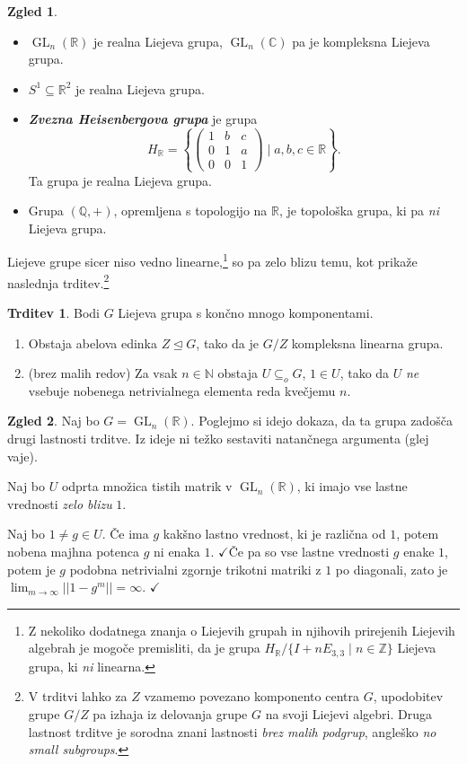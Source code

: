 \documentclass[11pt]{book}
\def\NN{\mathbb{N}}
\def\ZZ{\mathbb{Z}}
\def\QQ{\mathbb{Q}}
\def\RR{\mathbb{R}}
\def\CC{\mathbb{C}}
\DeclareMathOperator\GL{GL}
\def\definicija{\color{rdeca}\bf\em}
\def\vprasanje{\color{oranzna}}
\def\literatura{\color{modra}}
\def\vaje{{\literatura (glej vaje)}}
\def\kljuka{$\checkmark$}
\theoremstyle{definition}
\theoremstyle{zgled}
\newtheorem*{zgled}{Zgled}
\theoremstyle{odprtproblem}
\theoremstyle{domacanaloga}
\theoremstyle{izrek}
\newtheorem*{trditev}{Trditev}
\begin{document}
\begin{zgled}
\begin{itemize}
    \item $\GL_n(\RR)$ je realna Liejeva grupa, $\GL_n(\CC)$ pa je kompleksna Liejeva grupa.
    \item $S^1 \subseteq \RR^2$ je realna Liejeva grupa.
    \item {\definicija Zvezna Heisenbergova grupa} je grupa
    \[
    H_{\RR} = \left\{ \begin{pmatrix} 1 & b & c \\ 0 & 1 & a \\ 0 & 0 & 1 \end{pmatrix} \mid a,b,c \in \RR \right\}.
    \]
    Ta grupa je realna Liejeva grupa.
    \item Grupa $(\QQ, +)$, opremljena s topologijo na $\RR$, je topološka grupa, ki pa {\em ni} Liejeva grupa.
\end{itemize}
\end{zgled}

Liejeve grupe sicer niso vedno linearne,\footnote{Z nekoliko dodatnega znanja o Liejevih grupah in njihovih prirejenih Liejevih algebrah je mogoče premisliti, da je grupa $H_\RR / \{ I + n E_{3,3} \mid n \in \ZZ \}$ Liejeva grupa, ki {\em ni} linearna.} so pa zelo blizu temu, kot prikaže naslednja trditev.\footnote{V trditvi lahko za $Z$ vzamemo povezano komponento centra $G$, upodobitev grupe $G/Z$ pa izhaja iz delovanja grupe $G$ na svoji Liejevi algebri. Druga lastnost trditve je sorodna znani lastnosti {\em brez malih podgrup}, angleško {\em no small subgroups}.}

\begin{trditev}
Bodi $G$ Liejeva grupa s končno mnogo komponentami.
\vspace{-0.5\baselineskip}
\begin{enumerate}[noitemsep]
    \item Obstaja abelova edinka $Z \unlhd G$, tako da je $G/Z$ kompleksna linearna grupa.
    \item {\vprasanje (brez malih redov)} Za vsak $n \in \NN$ obstaja $U \subseteq_o G$, $1 \in U$, tako da $U$ {\em ne} vsebuje nobenega netrivialnega elementa reda kvečjemu $n$. \vspace{-\baselineskip}
\end{enumerate}
\end{trditev}

\begin{zgled}
Naj bo $G = \GL_n(\RR)$. Poglejmo si idejo dokaza, da ta grupa zadošča drugi lastnosti trditve. Iz ideje ni težko sestaviti natančnega argumenta \vaje.

Naj bo $U$ odprta množica tistih matrik v $\GL_n(\RR)$, ki imajo vse lastne vrednosti {\em zelo blizu} $1$.

Naj bo $1 \neq g \in U$. Če ima $g$ kakšno lastno vrednost, ki je različna od $1$, potem nobena majhna potenca $g$ ni enaka $1$. \kljuka Če pa so vse lastne vrednosti $g$ enake $1$, potem je $g$ podobna netrivialni zgornje trikotni matriki z $1$ po diagonali, zato je $\lim_{m \to \infty} ||1 - g^m|| = \infty$. \kljuka
\end{zgled}  
\end{document}

